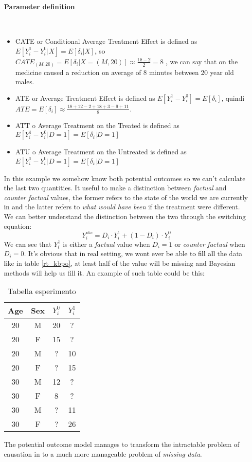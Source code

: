 \paragraph{Parameter definition} \hspace{0pt} \\
\label{parag:param}
\begin{itemize}
\item CATE or Conditional Average Treatment Effect is defined as $E[Y^{1}_i- Y^{0}_i|X] = E[\delta_i|X]$, so $CATE_{(M,20)}=E[\delta_i|X=(M,20)] \approx \frac{18-2}{2}=8$ , we can say that on the medicine caused a reduction on average of 8 minutes between 20 year old males.
\item ATE or Average Treatment Effect is defined as  $E[Y^{1}_i- Y^{0}_i] = E[\delta_i]$, quindi $ATE= E[\delta_i] \approx \frac{18+12-2+18+3-9+11}{8}$.
\item ATT o Average Treatment on the Treated is defined as  $E[Y^{1}_i- Y^{0}_i|D=1] = E[\delta_i|D=1]$ 
\item ATU o Average Treatment on the Untreated is defined as
$E[Y^{1}_i- Y^{0}_i|D=1] = E[\delta_i|D=1]$
\end{itemize}
 

In this example we somehow know both potential outcomes so we can't calculate the last two quantities.
It useful to make a distinction between \textit{factual} and \textit{counter factual} values, the former refers to the state of the world we are currently in and the latter refers to \textit{what would have been} if the treatment were different.
We can better understand the distinction between the two through the switching equation: 
\begin{equation}
Y_i^{obs} = D_i \cdot Y^1_i + (1-D_i) \cdot Y^0_i
\label{eq:switching}
\end{equation}
We can see that $Y^1_i$ is either a \textit{factual} value when $D_i=1$ or \textit{counter factual} when $D_i=0$.
It's obvious that in real setting, we wont ever be able to fill all the data like in table \ref{rt_kbpo}, at least half of the value will be missing and Bayesian methods will help us fill it.
An example of such table could be this:
\begin{table}[H]
\centering
\begin{tabular}{|c|c|c|c|}
\hline
Age & Sex & $Y^{0}_i$ & $Y^{1}_i$ \\ \hline
20 & M & 20 & ?  \\ \hline
20 & F & 15 & ? \\ \hline
20 & M & ? & 10 \\ \hline
20 & F & ? & 15  \\ \hline
30 & M & 12 & ? \\ \hline
30 & F & 8 & ? \\ \hline
30 & M & ? & 11   \\ \hline
30 & F & ? & 26 \\ \hline
\end{tabular}
\caption{Tabella esperimento }
\end{table}
The potential outcome model manages to transform the intractable problem of causation in to a much more manageable problem of \textit{missing data}.


